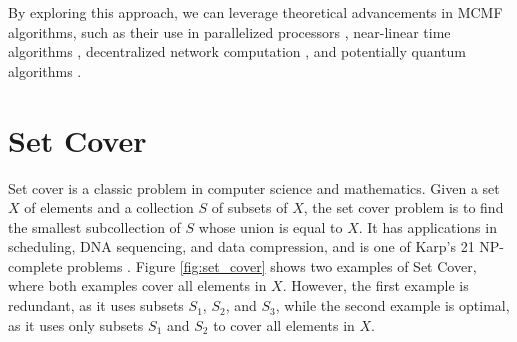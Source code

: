             By exploring this approach, we can leverage theoretical advancements in MCMF algorithms, such as their use in parallelized processors \cite{akidau2013millwheel}, near-linear time algorithms \cite{9996881}, decentralized network computation \cite{alon2019decentralized}, and potentially quantum algorithms \cite{brandao2019quantum}.
             
        
    \section{Set Cover} \label{WSC}
    
        Set cover is a classic problem in computer science and mathematics. Given a set $X$ of elements and a collection $S$ of subsets of $X$, the set cover problem is to find the smallest subcollection of $S$ whose union is equal to $X$\cite{cormen, bondy1976graph}. It has applications in scheduling, DNA sequencing, and data compression, and is one of Karp's 21 NP-complete problems \cite{karp1972reducibility}. 
        Figure \ref{fig:set_cover} shows two examples of Set Cover, where both examples cover all elements in $X$. However, the first example is redundant, as it uses subsets $S_1$, $S_2$, and $S_3$, while the second example is optimal, as it uses only subsets $S_1$ and $S_2$ to cover all elements in $X$.

